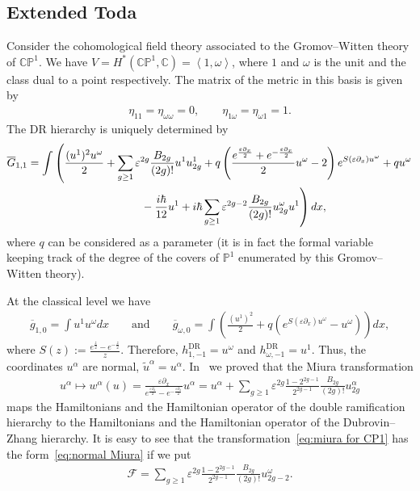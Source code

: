 \documentclass[pdftex]{sigma}
\numberwithin{equation}{section}
\newcommand{\mbP}{\mathbb P}
\newcommand{\mbC}{\mathbb C}
\newcommand{\tu}{{\widetilde u}}
\newcommand{\og}{\overline g}
\def\CP{{{\mathbb C}{\mathbb P}}}
\def\d{{\partial}}
\newcommand{\<}{\left<}
\renewcommand{\>}{\right>}
\newcommand{\eps}{\varepsilon}
\newcommand{\DR}{\mathrm{DR}}
\newcommand{\cF}{\mathcal F}
\newcommand{\oG}{{\overline G}}
\begin{document}
\subsection{Extended Toda}
Consider the cohomological f\/ield theory associated to the Gromov--Witten theory of $\CP^1$. We have $V=H^*(\CP^1,\mbC)=\<1,\omega\>$, where $1$ and $\omega$ is the unit and the class dual to a point respectively. The matrix of the metric in this basis is given by
\begin{gather*}
\eta_{11}=\eta_{\omega\omega}=0,\qquad \eta_{1\omega}=\eta_{\omega 1}=1.
\end{gather*}
The DR hierarchy is uniquely determined by
\begin{gather*}
\oG_{1,1}=\int \left(\frac{(u^1)^2u^\omega}{2}+\sum_{g\ge 1}\eps^{2g}\frac{B_{2g}}{(2g)!}u^1u^1_{2g}+q\left(\frac{e^{\frac{\eps\d_x}{2}}+e^{-\frac{\eps\d_x}{2}}}{2}u^\omega-2\right)e^{S(\eps\d_x)u^\omega}+q u^\omega\right.\\
 \left. \hphantom{\oG_{1,1}=\int}{} -\frac{i\hbar}{12}u^1+i\hbar\sum_{g\ge 1}\eps^{2g-2}\frac{B_{2g}}{(2g)!}u^\omega_{2g} u^1\right)dx,
\end{gather*}
where $q$ can be considered as a parameter (it is in fact the formal variable keeping track of the degree of the covers of $\mbP^1$ enumerated by this Gromov--Witten theory).

At the classical level we have
\begin{gather*}
\og_{1,0}=\int u^1 u^\omega dx \qquad \text{and} \qquad \og_{\omega,0}=\int\left(\frac{(u^1)^2}{2}+q\left(e^{S(\eps\d_x)u^\omega}-u^\omega\right)\right)dx,
\end{gather*}
where $S(z):=\frac{e^{\frac{z}{2}}-e^{-\frac{z}{2}}}{z}$. Therefore, $h^\DR_{1,-1}=u^\omega$ and $h^{\DR}_{\omega,-1}=u^1$. Thus, the coordinates $u^\alpha$ are normal, $\tu^\alpha=u^\alpha$. In~\cite{BR14} we proved that the Miura transformation
\begin{gather}\label{eq:miura for CP1}
u^\alpha\mapsto w^\alpha(u)=\frac{\eps\d_x}{e^{\frac{\eps\d_x}{2}}-e^{-\frac{\eps\d_x}{2}}}u^\alpha=u^\alpha+\sum_{g\ge 1}\eps^{2g}\frac{1-2^{2g-1}}{2^{2g-1}}\frac{B_{2g}}{(2g)!}u^\alpha_{2g}
\end{gather}
maps the Hamiltonians and the Hamiltonian operator of the double ramif\/ication hierarchy to the Hamiltonians and the Hamiltonian operator of the Dubrovin--Zhang hierarchy. It is easy to see that the transformation~\eqref{eq:miura for CP1} has the form~\eqref{eq:normal Miura} if we put
\begin{gather*}
\cF=\sum_{g\ge 1}\eps^{2g}\frac{1-2^{2g-1}}{2^{2g-1}}\frac{B_{2g}}{(2g)!}u^\omega_{2g-2}.
\end{gather*}
\end{document}
